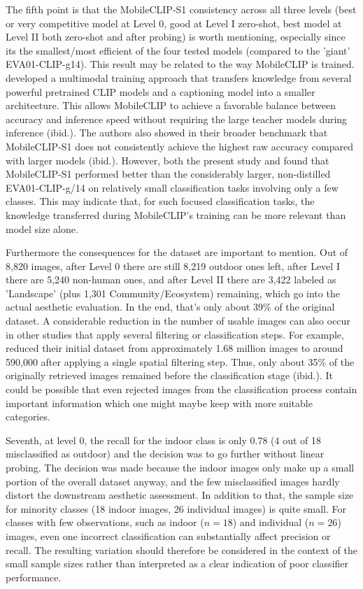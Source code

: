 \documentclass[11pt]{article}
\renewcommand{\_}{\textunderscore\allowbreak{}}
\begin{document}
The fifth point is that the MobileCLIP-S1 consistency across all three levels (best or very competitive model at Level 0, good at Level I zero-shot, best model at Level II both zero-shot and after probing) is worth mentioning, especially since its the smallest/most efficient of the four tested models (compared to the 'giant' EVA01-CLIP-g14). This result may be related to the way MobileCLIP is trained. \citet{vasu_mobileclip_2024} developed a multimodal training approach that transfers knowledge from several powerful pretrained CLIP models and a captioning model into a smaller architecture. This allows MobileCLIP to achieve a favorable balance between accuracy and inference speed without requiring the large teacher models during inference (ibid.). The authors also showed in their broader benchmark that MobileCLIP-S1 does not consistently achieve the highest raw accuracy compared with larger models (ibid.). However, both the present study and \citet{liao_mapping_2025} found that MobileCLIP-S1 performed better than the considerably larger, non-distilled EVA01-CLIP-g/14 on relatively small classification tasks involving only a few classes. This may indicate that, for such focused classification tasks, the knowledge transferred during MobileCLIP's training can be more relevant than model size alone. 

Furthermore the consequences for the dataset are important to mention. Out of 8,820 images, after Level 0 there are still 8,219 outdoor ones left, after Level I there are 5,240 non-human ones, and after Level II there are 3,422 labeled as 'Landscape' (plus 1,301 Community/Ecosystem) remaining, which go into the actual aesthetic evaluation. In the end, that's only about 39\% of the original dataset. A considerable reduction in the number of usable images can also occur in other studies that apply several filtering or classification steps. For example, \citet{liao_mapping_2025} reduced their initial dataset from approximately 1.68 million images to around 590,000 after applying a single spatial filtering step. Thus, only about 35\% of the originally retrieved images remained before the classification stage (ibid.).
It could be possible that even rejected images from the classification process contain important information which one might maybe keep with more suitable categories. 

Seventh, at level 0, the recall for the indoor class is only 0.78 (4 out of 18 misclassified as outdoor) and the decision was to go further without linear probing.  The decision was made because the indoor images only make up a small portion of the overall dataset anyway, and the few misclassified images hardly distort the downstream aesthetic assessment. In addition to that, the sample size for minority classes (18 indoor images, 26 individual images) is quite small. For classes with few observations, such as indoor ($n = 18$) and individual ($n = 26$) images, even one incorrect classification can substantially affect precision or recall. The resulting variation should therefore be considered in the context of the small sample sizes rather than interpreted as a clear indication of poor classifier performance.
\end{document}
